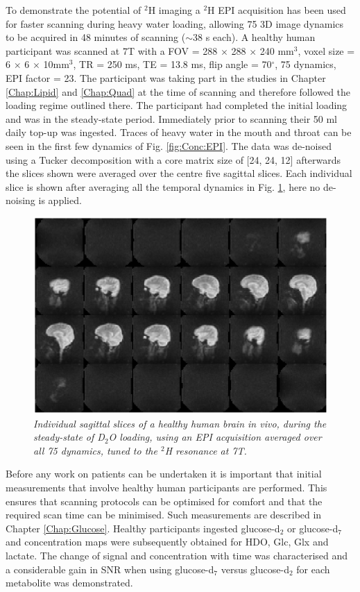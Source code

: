 To demonstrate the potential of $^2$H imaging a $^2$H \ac{EPI} acquisition has been used for faster scanning during heavy water loading, allowing 75 3D image dynamics to be acquired in 48 minutes of scanning ($\sim$38 s each). A healthy human participant was scanned at 7T with a \ac{FOV} = 288 $\times$ 288 $\times$ 240 mm$^3$, voxel size = 6 $\times$ 6 $\times$ 10mm$^3$, \ac{TR} = 250 ms, TE = 13.8 ms, flip angle = 70$^\circ$, 75 dynamics, \ac{EPI} factor = 23. The participant was taking part in the studies in Chapter \ref{Chap:Lipid} and \ref{Chap:Quad} at the time of scanning and therefore followed the loading regime outlined there. The participant had completed the initial loading and was in the steady-state period. Immediately prior to scanning their 50 ml daily top-up was ingested. Traces of heavy water in the mouth and throat can be seen in the first few dynamics of Fig. \ref{fig:Conc:EPI}. The data was de-noised using a Tucker decomposition with a core matrix size of [24, 24, 12] afterwards the slices shown were averaged over the centre five sagittal slices. Each individual slice is shown after averaging all the temporal dynamics in Fig. \ref{fig:Conc:EPI_avg}, here no de-noising is applied.

\begin{figure}[H]
    \centering
    \includegraphics[width=1\textwidth]{Figures/D2O/EPI_avg.png}
    \caption{\textit{Individual sagittal slices of a healthy human brain in vivo, during the steady-state of D$_2$O loading, using an \ac{EPI} acquisition averaged over all 75 dynamics, tuned to the $^2$H resonance at 7T.}}
    \label{fig:Conc:EPI_avg}
\end{figure}

Before any work on patients can be undertaken it is important that initial measurements that involve healthy human participants are performed. This ensures that scanning protocols can be optimised for comfort and that the required scan time can be minimised. Such measurements are described in Chapter \ref{Chap:Glucose}. Healthy participants ingested glucose-d$_2$ or glucose-d$_7$ and concentration maps were subsequently obtained for \ac{HDO}, Glc, Glx and lactate. The change of signal and concentration with time was characterised and a considerable gain in \ac{SNR} when using glucose-d$_7$ versus glucose-d$_2$ for each metabolite was demonstrated.


